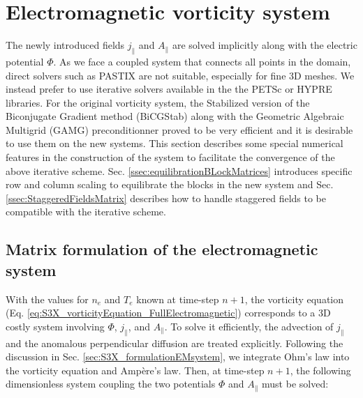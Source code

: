 \section{Electromagnetic vorticity system}
\label{sec:impl_EMvorticity}

The newly introduced fields $j_\parallel$ and $A_\parallel$ are solved implicitly along with the electric potential $\Phi$. As we face a coupled system that connects all points in the domain, direct solvers such as PASTIX are not suitable, especially for fine 3D meshes. We instead prefer to use iterative solvers available in the the PETSc or HYPRE libraries. For the original vorticity system, the Stabilized version of the Biconjugate Gradient method (BiCGStab) along with the Geometric Algebraic Multigrid (GAMG) preconditionner proved to be very efficient and it is desirable to use them on the new systems. This section describes some special numerical features in the construction of the system to facilitate the convergence of the above iterative scheme. Sec. \ref{ssec:equilibrationBLockMatrices} introduces specific row and column scaling to equilibrate the blocks in the new system and Sec. \ref{ssec:StaggeredFieldsMatrix} describes how to handle staggered fields to be compatible with the iterative scheme.

\subsection{Matrix formulation of the electromagnetic system}

With the values for $n_e$ and $T_e$ known at time-step $n+1$, the vorticity equation (Eq. \ref{eq:S3X_vorticityEquation_FullElectromagnetic}) corresponds to a 3D costly system involving $\Phi$, $j_\parallel$, and $A_\parallel$. To solve it efficiently, the advection of $j_\parallel$ and the anomalous perpendicular diffusion are treated explicitly. Following the discussion in Sec. \ref{sec:S3X_formulationEMsystem}, we integrate Ohm's law into the vorticity equation and Ampère's law. Then, at time-step $n+1$, the following dimensionless system coupling the two potentials $\Phi$ and $A_\parallel$ must be solved: \\

